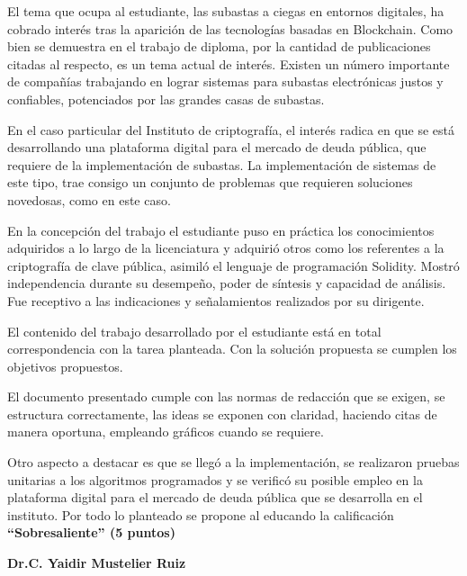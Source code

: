 \begin{opinion}
    El tema que ocupa al estudiante, las subastas a ciegas en entornos digitales, ha
    cobrado interés tras la aparición de las tecnologías basadas en Blockchain. Como
    bien se demuestra en el trabajo de diploma, por la cantidad de publicaciones
    citadas al respecto, es un tema actual de interés. Existen un número importante
    de compañías trabajando en lograr sistemas para subastas electrónicas justos y
    confiables, potenciados por las grandes casas de subastas.

    En el caso particular del Instituto de criptografía, el interés radica en que se está
    desarrollando una plataforma digital para el mercado de deuda pública, que requiere
    de la implementación de subastas. La implementación de sistemas de este tipo, trae
    consigo un conjunto de problemas que requieren soluciones novedosas, como en este
    caso.
    
    En la concepción del trabajo el estudiante puso en práctica los conocimientos
    adquiridos a lo largo de la licenciatura y adquirió otros como los referentes a la
    criptografía de clave pública, asimiló el lenguaje de programación Solidity. Mostró
    independencia durante su desempeño, poder de síntesis y capacidad de análisis. Fue
    receptivo a las indicaciones y señalamientos realizados por su dirigente.
    
    El contenido del trabajo desarrollado por el estudiante está en total
    correspondencia con la tarea planteada. Con la solución propuesta se cumplen los
    objetivos propuestos.

    El documento presentado cumple con las normas de redacción que se exigen, se
    estructura correctamente, las ideas se exponen con claridad, haciendo citas de manera
    oportuna, empleando gráficos cuando se requiere.
    
    Otro aspecto a destacar es que se llegó a la implementación, se realizaron
    pruebas unitarias a los algoritmos programados y se verificó su posible empleo en la
    plataforma digital para el mercado de deuda pública que se desarrolla en el instituto.
    Por todo lo planteado se propone al educando la calificación \textbf{ “Sobresaliente” (5 puntos)}

    \begin{flushright}
        \textbf{Dr.C. Yaidir Mustelier Ruiz}
    \end{flushright}

\end{opinion}